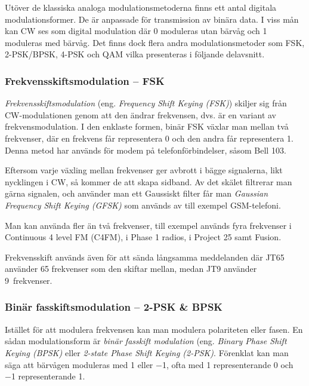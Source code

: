 Utöver de klassiska analoga modulationsmetoderna finns ett antal digitala
modulationsformer.
De är anpassade för transmission av binära data.
I viss mån kan CW ses som digital modulation där 0 moduleras utan bärvåg
och 1 moduleras med bärvåg.
Det finns dock flera andra modulationsmetoder som FSK, 2-PSK/BPSK, 4-PSK och
QAM vilka presenteras i följande delavsnitt.

\subsubsection{Frekvensskiftsmodulation -- FSK}

\emph{Frekvensskiftsmodulation} (eng. \emph{Frequency Shift Keying (FSK)})
skiljer sig från CW-modulationen genom att den ändrar frekvensen, dvs. är en
variant av frekvensmodulation. I den enklaste formen, binär FSK växlar man
mellan två frekvenser, där en frekvens får representera 0 och den andra får
representera 1. Denna metod har används för modem på telefonförbindelser,
såsom Bell 103.

Eftersom varje växling mellan frekvenser ger avbrott i bägge signalerna, likt
nycklingen i CW, så kommer de att skapa sidband. Av det skälet filtrerar man
gärna signalen, och använder man ett Gaussiskt filter får man
\emph{Gaussian Frequency Shift Keying (GFSK)} som används av till exempel GSM-telefoni.

Man kan använda fler än två frekvenser, till exempel används fyra frekvenser i
Continuous 4 level FM (C4FM), i Phase 1 radios, i Project 25 samt Fusion.

Frekvensskift används även för att sända långsamma meddelanden där JT65
använder 65 frekvenser som den skiftar mellan, medan JT9 använder 9~frekvenser.

\subsubsection{Binär fasskiftsmodulation -- 2-PSK \& BPSK}

Istället för att modulera frekvensen kan man modulera polariteten eller fasen.
En sådan modulationsform är \emph{binär fasskift modulation} (eng.
\emph{Binary Phase Shift Keying (BPSK)} eller \emph{2-state Phase Shift Keying
(2-PSK)}.
Förenklat kan man säga att bärvågen moduleras med \num{+1} eller \num{-1}, ofta
med \num{+1} representerande \num{0} och \num{-1} representerande \num{1}.

